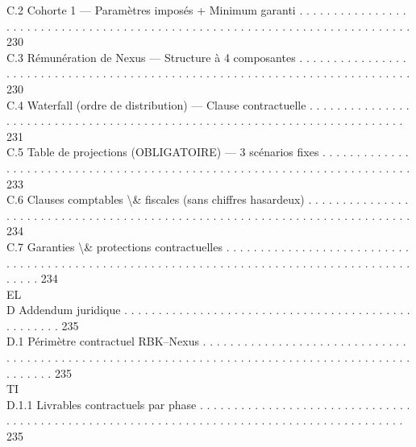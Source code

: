 C.2     Cohorte 1 — Paramètres imposés + Minimum garanti . . . . . . . . . . . . . . . . . . . . . . . . . . . . . . . . . . . . . . . . . . . . . . . . . . . . . . . . . . . . . . . . . . . . . . . . . . . 230\\
C.3     Rémunération de Nexus — Structure à 4 composantes . . . . . . . . . . . . . . . . . . . . . . . . . . . . . . . . . . . . . . . . . . . . . . . . . . . . . . . . . . . . . . . . . . . . . . . . . . . 230\\
C.4     Waterfall (ordre de distribution) — Clause contractuelle . . . . . . . . . . . . . . . . . . . . . . . . . . . . . . . . . . . . . . . . . . . . . . . . . . . . . . . . . . . . . . . . . . . . . . . . . 231\\
C.5     Table de projections (OBLIGATOIRE) — 3 scénarios fixes . . . . . . . . . . . . . . . . . . . . . . . . . . . . . . . . . . . . . . . . . . . . . . . . . . . . . . . . . . . . . . . . . . . . . . . . 233\\
C.6     Clauses comptables \textbackslash{}& fiscales (sans chiffres hasardeux) . . . . . . . . . . . . . . . . . . . . . . . . . . . . . . . . . . . . . . . . . . . . . . . . . . . . . . . . . . . . . . . . . . . . . . . . . . 234\\
C.7     Garanties \textbackslash{}& protections contractuelles . . . . . . . . . . . . . . . . . . . . . . . . . . . . . . . . . . . . . . . . . . . . . . . . . . . . . . . . . . . . . . . . . . . . . . . . . . . . . . . . . . . . . . . . . . . 234\\
\vspace{0.5em}
\vspace{0.5em}
\vspace{0.5em}
\vspace{0.5em}
EL\\
D     Addendum juridique . . . . . . . . . . . . . . . . . . . . . . . . . . . . . . . . . . . . . . . . . . . . . . . . . . 235\\
D.1     Périmètre contractuel RBK–Nexus . . . . . . . . . . . . . . . . . . . . . . . . . . . . . . . . . . . . . . . . . . . . . . . . . . . . . . . . . . . . . . . . . . . . . . . . . . . . . . . . . . . . . . . . . . . . . . . . 235\\
\vspace{0.5em}
\vspace{0.5em}
\vspace{0.5em}
\vspace{0.5em}
TI\\
D.1.1               Livrables contractuels par phase . . . . . . . . . . . . . . . . . . . . . . . . . . . . . . . . . . . . . . . . . . . . . . . . . . . . . . . . . . . . . . . . . . . . . . . . . . . . . . . . . . . . . . . . . 235\\
